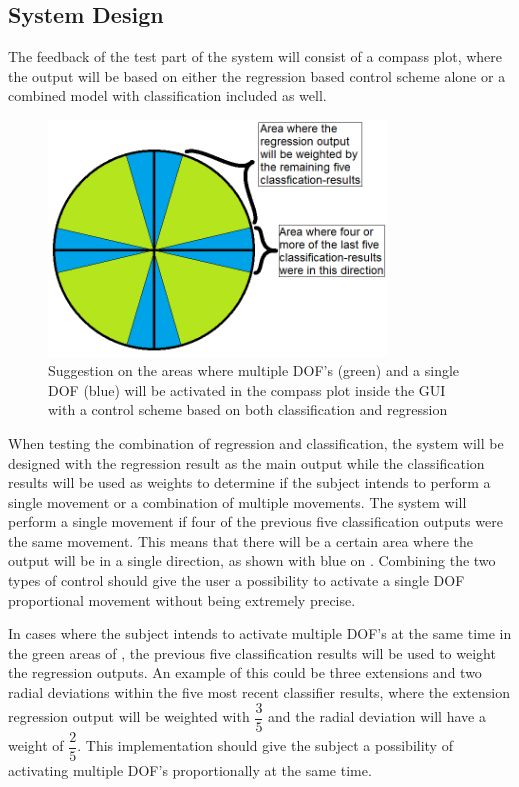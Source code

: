 \subsection{System Design}

The feedback of the test part of the system will consist of a compass plot, where the output will be based on either the regression based control scheme alone or a combined model with classification included as well.

\begin{figure}[H]                                        
	\includegraphics[width=0.8\textwidth]{figures/controlSuggestion} 
	\caption{Suggestion on the areas where multiple DOF's (green) and a single DOF (blue) will be activated in the compass plot inside the GUI with a control scheme based on both classification and regression}
	\label{fig:controlSuggestion} 
\end{figure}  

When testing the combination of regression and classification, the system will be designed with the regression result as the main output while the classification results will be used as weights to determine if the subject intends to perform a single movement or a combination of multiple movements. The system will perform a single movement if four of the previous five classification outputs were the same movement. This means that there will be a certain area where the output will be in a single direction, as shown with blue on . Combining the two types of control should give the user a possibility to activate a single DOF proportional movement without being extremely precise.

In cases where the subject intends to activate multiple DOF's at the same time in the green areas of , the previous five classification results will be used to weight the regression outputs. An example of this could be three extensions and two radial deviations within the five most recent classifier results, where the extension regression output will be weighted with $ \dfrac{3}{5} $ and the radial deviation will have a weight of $ \dfrac{2}{5} $. This implementation should give the subject a possibility of activating multiple DOF's proportionally at the same time. 

